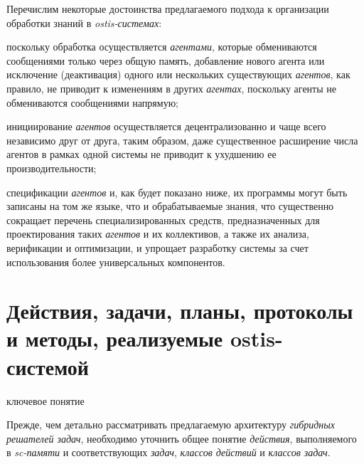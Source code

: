 Перечислим некоторые достоинства предлагаемого подхода к организации обработки знаний в \textit{ostis-системах}:
\begin{textitemize}
	\item поскольку обработка осуществляется \textit{агентами}, которые обмениваются сообщениями только через общую память, добавление нового агента или исключение (деактивация) одного или нескольких существующих \textit{агентов}, как правило, не приводит к изменениям в других \textit{агентах}, поскольку агенты не обмениваются сообщениями напрямую;
	\item инициирование \textit{агентов} осуществляется децентрализованно и чаще всего независимо друг от друга, таким образом, даже существенное расширение числа агентов в рамках одной системы не приводит к ухудшению ее производительности;
	\item спецификации \textit{агентов} и, как будет показано ниже, их программы могут быть записаны на том же языке, что и обрабатываемые знания, что существенно сокращает перечень специализированных средств, предназначенных для проектирования таких \textit{агентов} и их коллективов, а также их анализа, верификации и оптимизации, и упрощает разработку системы за счет использования более универсальных компонентов.
\end{textitemize}

\section{Действия, задачи, планы, протоколы и методы, реализуемые ostis-системой}
\label{sec_ps_actions}

\begin{SCn}
\begin{scnrelfromlist}{ключевое понятие}
\end{scnrelfromlist}
\end{SCn}

Прежде, чем детально рассматривать предлагаемую архитектуру \textit{гибридных решателей задач}, необходимо уточнить общее понятие \textit{действия}, выполняемого в \textit{sc-памяти} и соответствующих \textit{задач}, \textit{классов действий} и \textit{классов задач}.

\begin{SCn}
\end{SCn}


